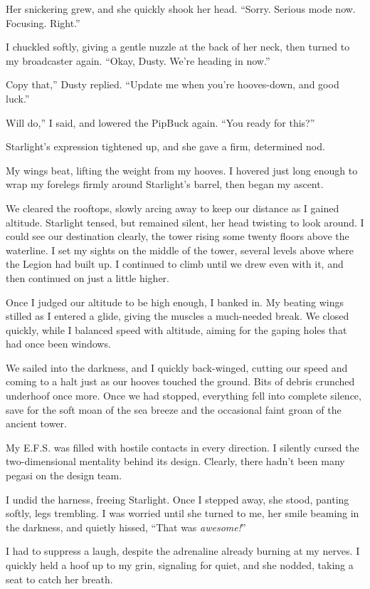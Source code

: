Her snickering grew, and she quickly shook her head. “Sorry. Serious mode now. Focusing. Right.”

I chuckled softly, giving a gentle nuzzle at the back of her neck, then turned to my broadcaster again. “Okay, Dusty. We’re heading in now.”

\leavevmode{}Copy that,” Dusty replied. “Update me when you’re hooves-down, and good luck.”

\leavevmode{}Will do,” I said, and lowered the PipBuck again. “You ready for this?”

Starlight’s expression tightened up, and she gave a firm, determined nod.

My wings beat, lifting the weight from my hooves. I hovered just long enough to wrap my forelegs firmly around Starlight’s barrel, then began my ascent.

We cleared the rooftops, slowly arcing away to keep our distance as I gained altitude. Starlight tensed, but remained silent, her head twisting to look around. I could see our destination clearly, the tower rising some twenty floors above the waterline. I set my sights on the middle of the tower, several levels above where the Legion had built up. I continued to climb until we drew even with it, and then continued on just a little higher.

Once I judged our altitude to be high enough, I banked in. My beating wings stilled as I entered a glide, giving the muscles a much-needed break. We closed quickly, while I balanced speed with altitude, aiming for the gaping holes that had once been windows.

We sailed into the darkness, and I quickly back-winged, cutting our speed and coming to a halt just as our hooves touched the ground. Bits of debris crunched underhoof once more. Once we had stopped, everything fell into complete silence, save for the soft moan of the sea breeze and the occasional faint groan of the ancient tower.

My E.F.S. was filled with hostile contacts in every direction. I silently cursed the two-dimensional mentality behind its design. Clearly, there hadn’t been many pegasi on the design team.

I undid the harness, freeing Starlight. Once I stepped away, she stood, panting softly, legs trembling. I was worried until she turned to me, her smile beaming in the darkness, and quietly hissed, “That was \textit{awesome!}”

I had to suppress a laugh, despite the adrenaline already burning at my nerves. I quickly held a hoof up to my grin, signaling for quiet, and she nodded, taking a seat to catch her breath.


